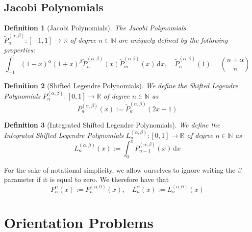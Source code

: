 \documentclass[10pt,a4paper]{article}
\newtheorem{defn}{Definition}
\begin{document}
    
\subsection{Jacobi Polynomials}

    \begin{defn}[Jacobi Polynomials]
        The Jacobi Polynomials $\tilde{P}_n^{(\alpha,\beta)} : [-1, 1] \to \mathbb{R}$ of degree $n \in \mathbb{N}$ are uniquely defined by the following properties:
        \begin{equation*}
            \int_{-1}^1\! (1-x)^{\alpha}(1+x)^{\beta}\tilde{P}_n^{(\alpha,\beta)}(x)\tilde{P}_m^{(\alpha.\beta)}(x) \,\mathrm{d}x, \quad \tilde{P}_n^{(\alpha,\beta)}(1) = \binom{n+\alpha}{n}
        \end{equation*}
    \end{defn}

    \begin{defn}[Shifted Legendre Polynomials]
        We define the Shifted Legendre Polynomials $P_n^{(\alpha,\beta)} : [0, 1] \to \mathbb{R}$ of degree $n \in \mathbb{N}$ as
        \begin{equation*}
            P_n^{(\alpha,\beta)}(x) := \tilde{P}_n^{(\alpha,\beta)}(2x-1)
        \end{equation*}
    \end{defn}

    \begin{defn}[Integrated Shifted Legendre Polynomials]
        We define the Integrated Shifted Legendre Polynomials $L_n^{(\alpha,\beta)} : [0, 1] \to \mathbb{R}$ of degree $n \in \mathbb{N}$ as
        \begin{equation*}
            L_n^{(\alpha,\beta)}(x) := \int_0^x\! P_{n-1}^{(\alpha,\beta)}(x) \,\mathrm{d}x
        \end{equation*}
    \end{defn}

    For the sake of notational simplicity, we allow ourselves to ignore writing the $\beta$ parameter if it is equal to zero. We therefore have that
    \begin{equation*}
        P_n^{\alpha}(x) := P_n^{(\alpha,0)}(x), \quad L_n^{\alpha}(x) := L_n^{(\alpha,0)}(x)
    \end{equation*}


\section{Orientation Problems}
\end{document}

